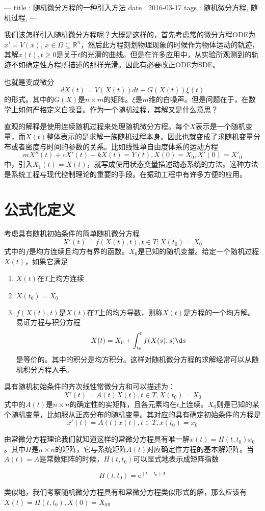 ---
title : 随机微分方程的一种引入方法
date  : 2016-03-17
tags  : 随机微分方程, 随机过程, 
---

我们该怎样引入随机微分方程呢？大概是这样的，首先考虑常的微分方程ODE为$x'=V(x)$, $x\in \Omega\subseteq\mathbb{R}^n$，然后此方程刻划物理现象的时候作为物体运动的轨迹，其解$x(t), t\geq 0$是关于$t$的光滑的曲线。但是在许多应用中，从实验所观测到的轨迹不如确定性方程所描述的那样光滑。因此有必要改正ODE为SDE。

也就是变成微分
\begin{equation}
d X(t) = V(X(t)) d t + G(X(t))\xi(t)
\end{equation}
的形式。其中的$G(X)$是$n\times m$的矩阵。$\xi$是$m$维的白噪声。但是问题在于，在数学上如何严格定义白噪音。作为一个随机过程，其解又是什么意思？

直观的解释是使用连续随机过程来处理随机微分方程。每个$X$表示是一个随机变量，而$X(t)$整体表示的是求解一族随机过程本身。因此也就变成了求随机变量分布或者密度与时间的参数的关系。比如线性单自由度体系的运动方程
\begin{equation}
mX''(t) + cX'(t) + kX(t) = Y(t), X(0) = X_0, X'(0) = X'_0
\end{equation}
中，引入$X_1(t) = X(t)$，就写成使用状态变量描述动态系统的方法。这种方法是系统工程与现代控制理论的重要的手段。在振动工程中有许多方便的应用。

\section{公式化定义}

考虑具有随机初始条件的简单随机微分方程
\begin{equation}
X'(t) = f(X(t),t) , t\in T; X(t_0) = X_0
\end{equation}
式中的$f$是均方连续且均方有界的函数。$X_0$是已知的随机变量。给定一个随机过程$X(t)$，如果它满足
\begin{enumerate}
\item $X(t)$在$T$上均方连续
\item $X(t_0) = X_0$
\item $f(X(t),t)$是$X(t)$在$T$上的均方导数，则称$X(t)$是方程的一个均方解。易证方程与积分方程
\begin{equation}
X(t) = X_0 + \int_{t_0}^t f(X(s),s)\d s
\end{equation}
是等价的。其中的积分是均方积分。这样对随机微分方程的求解经常可以从随机积分方程入手。
\end{enumerate}

具有随机初始条件的齐次线性常微分方和可以描述为：
\begin{equation}
X'(t) = A(t) X(t), t\in T, X(t_0) = X_0
\end{equation}
式中的$A(t)$是$n\times n$的确定性的实矩阵，且各元素均在$t$上连续。$X_0$则是已知的某个随机变量，比如服从正态分布的随机变量。其对应的具有确定初始条件的方程是
\begin{equation}
x'(t) = A(t) x(t), t\in T, x(t_0) = x_0
\end{equation}

由常微分方程理论我们就知道这样的常微分方程具有唯一解$x(t) = H(t,t_0)x_0$。其中$H$是$n\times n$的矩阵，它与系统矩阵$A(t)$对应确定性方程的基本解矩阵。当$A(t)=A$是常数矩阵的时候，$H(t,t_0)$可以显式地表示成矩阵指数

$$H(t,t_0) = \mathrm{e}^{(t-t_0)A}$$

类似地，我们考察随机微分方程具有和常微分方程类似形式的解，那么应该有$X(t) = H(t,t_0), X(0)=X_0$。
